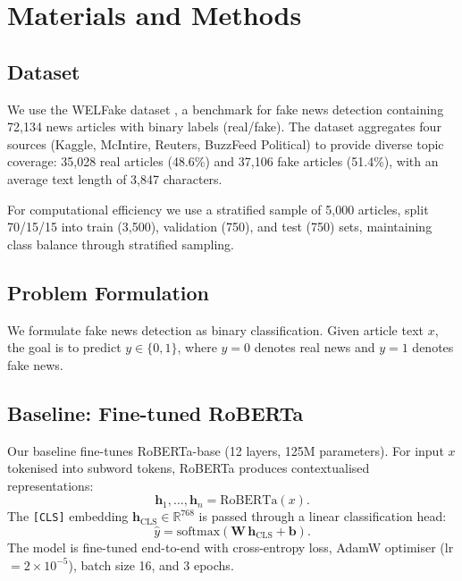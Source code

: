 \documentclass[10pt,twoside]{article}
\begin{document}
\section{Materials and Methods}

\subsection{Dataset}

We use the WELFake dataset \citep{welfake}, a benchmark for
fake news detection containing 72,134 news articles with
binary labels (real/fake).
The dataset aggregates four sources (Kaggle, McIntire,
Reuters, BuzzFeed Political) to provide diverse topic
coverage: 35,028 real articles (48.6\%) and 37,106 fake
articles (51.4\%), with an average text length of 3,847
characters.

For computational efficiency we use a stratified sample of
5,000 articles, split 70/15/15 into train (3,500), validation
(750), and test (750) sets, maintaining class balance through
stratified sampling.

\subsection{Problem Formulation}

We formulate fake news detection as binary classification.
Given article text $x$, the goal is to predict
$y \in \{0,1\}$, where $y{=}0$ denotes real news and
$y{=}1$ denotes fake news.

\subsection{Baseline: Fine-tuned RoBERTa}

Our baseline fine-tunes RoBERTa-base (12 layers, 125M
parameters).
For input $x$ tokenised into subword tokens, RoBERTa produces
contextualised representations:
\begin{equation}
  \mathbf{h}_1, \ldots, \mathbf{h}_n = \mathrm{RoBERTa}(x).
\end{equation}
The \texttt{[CLS]} embedding
$\mathbf{h}_{\mathrm{CLS}} \in \mathbb{R}^{768}$ is passed
through a linear classification head:
\begin{equation}
  \hat{y} = \mathrm{softmax}(
    \mathbf{W}\,\mathbf{h}_{\mathrm{CLS}} + \mathbf{b}).
\end{equation}
The model is fine-tuned end-to-end with cross-entropy loss,
AdamW optimiser (lr $= 2{\times}10^{-5}$), batch size 16,
and 3 epochs.
\end{document}
